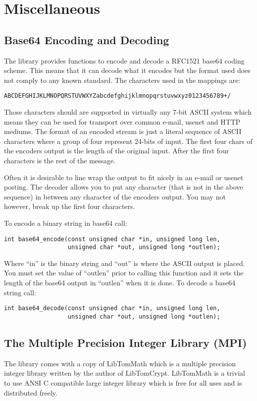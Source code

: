 \documentclass[a4paper]{book}
\begin{document}
\chapter{Miscellaneous}
\section{Base64 Encoding and Decoding}
The library provides functions to encode and decode a RFC1521 base64 coding scheme.  This means that it can decode what it 
encodes but the format used does not comply to any known standard.  The characters used in the mappings are:
\begin{verbatim}
ABCDEFGHIJKLMNOPQRSTUVWXYZabcdefghijklmnopqrstuvwxyz0123456789+/
\end{verbatim}
Those characters should are supported in virtually any 7-bit ASCII system which means they can be used for transport over
common e-mail, usenet and HTTP mediums.  The format of an encoded stream is just a literal sequence of ASCII characters
where a group of four represent 24-bits of input.  The first four chars of the encoders output is the length of the 
original input.  After the first four characters is the rest of the message.

Often it is desirable to line wrap the output to fit nicely in an e-mail or usenet posting.  The decoder allows you to
put any character (that is not in the above sequence) in between any character of the encoders output.  You may not however,
break up the first four characters.

To encode a binary string in base64 call:
   
\begin{verbatim}
int base64_encode(const unsigned char *in, unsigned long len, 
                  unsigned char *out, unsigned long *outlen);
\end{verbatim}
Where ``in'' is the binary string and ``out'' is where the ASCII output is placed.  You must set the value of ``outlen'' prior
to calling this function and it sets the length of the base64 output in ``outlen'' when it is done.  To decode a base64 
string call:
\begin{verbatim}
int base64_decode(const unsigned char *in, unsigned long len, 
                  unsigned char *out, unsigned long *outlen);
\end{verbatim}

\section{The Multiple Precision Integer Library (MPI)}
The library comes with a copy of LibTomMath  which is a multiple precision integer library written by the
author of LibTomCrypt.  LibTomMath is a trivial to use ANSI C compatible large integer library which is free 
for all uses and is distributed freely.
\end{document}
